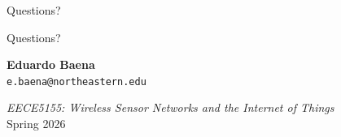 \documentclass[aspectratio=169,11pt]{beamer}
\begin{document}
\begin{frame}{Questions?}
    \begin{center}
        \Huge Questions?
        
        \vspace{1cm}
        \normalsize
        \textbf{Eduardo Baena}\\
        \texttt{e.baena@northeastern.edu}
        
        \vspace{0.5cm}
        \textit{EECE5155: Wireless Sensor Networks and the Internet of Things}\\
        Spring 2026
    \end{center}
\end{frame}
\end{document}
